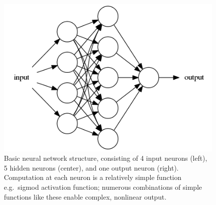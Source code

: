 \documentclass[11pt,letterpaper,journal]{IEEEtran}
\begin{document}
\begin{figure}[h]
  \centering
  \includegraphics[width=0.8\linewidth]{nn.dot.png}
  \caption{Basic neural network structure, consisting of 4 input neurons
  (left), 5 hidden neurons (center), and one output neuron (right). Computation
  at each neuron is a relatively simple function e.g.\ sigmod activation
  function; numerous combinations of simple functions like these enable complex,
nonlinear output.}
  \label{fig:nn}
\end{figure}
\end{document}
